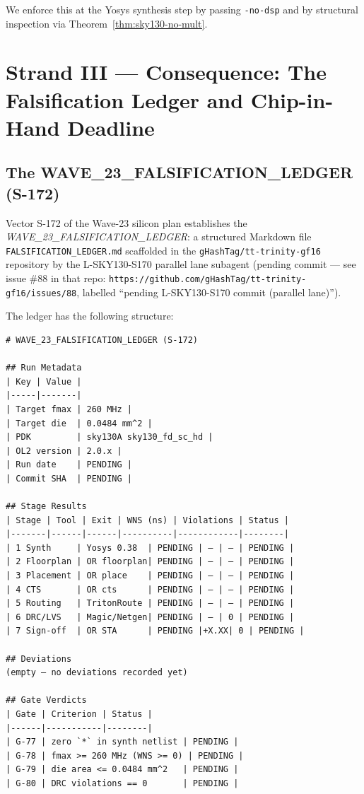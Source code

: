 We enforce this at the Yosys synthesis step by passing
\texttt{-no-dsp} and by structural inspection via Theorem~\ref{thm:sky130-no-mult}.

\section{Strand III — Consequence: The Falsification Ledger and
         Chip-in-Hand Deadline}
\label{sec:72:strand-iii}

\subsection{The WAVE\_23\_FALSIFICATION\_LEDGER (S-172)}
\label{subsec:72:ledger-overview}

Vector S-172 of the Wave-23 silicon plan establishes the
\emph{WAVE\_23\_FALSIFICATION\_LEDGER}: a structured Markdown file
\texttt{FALSIFICATION\_LEDGER.md} scaffolded in the
\texttt{gHashTag/tt-trinity-gf16} repository by the L-SKY130-S170 parallel
lane subagent (pending commit — see issue \#88 in that repo:
\texttt{https://github.com/gHashTag/tt-trinity-gf16/issues/88},
labelled ``pending L-SKY130-S170 commit (parallel lane)'').

The ledger has the following structure:

\begin{verbatim}
# WAVE_23_FALSIFICATION_LEDGER (S-172)

## Run Metadata
| Key | Value |
|-----|-------|
| Target fmax | 260 MHz |
| Target die  | 0.0484 mm^2 |
| PDK         | sky130A sky130_fd_sc_hd |
| OL2 version | 2.0.x |
| Run date    | PENDING |
| Commit SHA  | PENDING |

## Stage Results
| Stage | Tool | Exit | WNS (ns) | Violations | Status |
|-------|------|------|----------|------------|--------|
| 1 Synth     | Yosys 0.38  | PENDING | — | — | PENDING |
| 2 Floorplan | OR floorplan| PENDING | — | — | PENDING |
| 3 Placement | OR place    | PENDING | — | — | PENDING |
| 4 CTS       | OR cts      | PENDING | — | — | PENDING |
| 5 Routing   | TritonRoute | PENDING | — | — | PENDING |
| 6 DRC/LVS   | Magic/Netgen| PENDING | — | 0 | PENDING |
| 7 Sign-off  | OR STA      | PENDING |+X.XX| 0 | PENDING |

## Deviations
(empty — no deviations recorded yet)

## Gate Verdicts
| Gate | Criterion | Status |
|------|-----------|--------|
| G-77 | zero `*` in synth netlist | PENDING |
| G-78 | fmax >= 260 MHz (WNS >= 0) | PENDING |
| G-79 | die area <= 0.0484 mm^2   | PENDING |
| G-80 | DRC violations == 0       | PENDING |
\end{verbatim}

